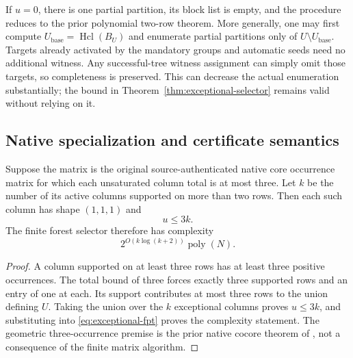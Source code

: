 \begin{remark}
\label{rem:exceptional-zero}
If $u=0$, there is one partial partition, its block list is empty, and
the procedure reduces to the prior polynomial two-row theorem.  More
generally, one may first compute
$U_{\mathrm{base}}=\operatorname{Hcl}(B_U)$ and enumerate partial
partitions only of $U\setminus U_{\mathrm{base}}$.  Targets already
activated by the mandatory groups and automatic seeds need no additional
witness.  Any successful-tree witness assignment can simply omit those
targets, so completeness is preserved.  This can decrease the actual
enumeration substantially; the bound in
Theorem~\ref{thm:exceptional-selector} remains valid without relying on it.
\end{remark}

\subsection{Native specialization and certificate semantics}
\label{subsec:exceptional-native}

\begin{proposition}
\label{prop:exceptional-native}
Suppose the matrix is the original source-authenticated native core
occurrence matrix for which each unsaturated column total is at most
three.  Let $k$ be the number of its active columns supported on more
than two rows.  Then each such column has shape $(1,1,1)$ and
\[
                             u\leq 3k.
\]
The finite forest selector therefore has complexity
\begin{equation}
                   2^{O(k\log(k+2))}\operatorname{poly}(N).
                   \label{eq:exceptional-native-fpt}
\end{equation}
\end{proposition}

\begin{proof}
A column supported on at least three rows has at least three positive
occurrences.  The total bound of three forces exactly three supported
rows and an entry of one at each.  Its support contributes at most three
rows to the union defining $U$.  Taking the union over the $k$ exceptional
columns proves $u\leq3k$, and substituting into
\eqref{eq:exceptional-fpt} proves the complexity statement.  The geometric
three-occurrence premise is the prior native cocore theorem of
\cite{IncomingDualNormalization}, not a consequence of the finite matrix
algorithm.
\end{proof}


